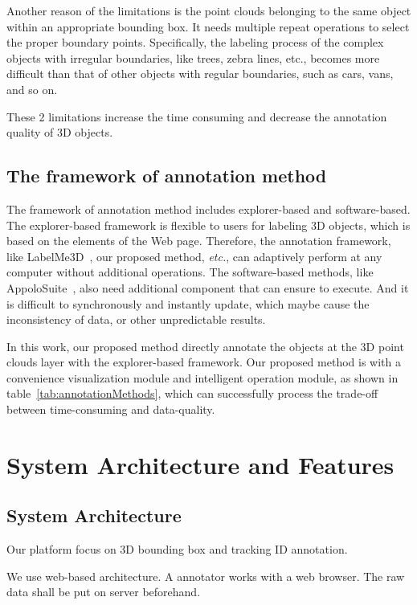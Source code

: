 \documentclass[letterpaper, 10 pt, conference]{ieeeconf}  %
\begin{document}
Another reason of the limitations is the point clouds belonging to the same object within an appropriate bounding box.
It needs multiple repeat operations to select the proper boundary points.
Specifically, the labeling process of the complex objects with irregular boundaries, like trees, zebra lines, etc., becomes more difficult than that of other objects with regular boundaries, such as cars, vans, and so on.

These 2 limitations increase the time consuming and decrease the annotation quality of 3D objects.
\subsection{The framework of annotation method}
The framework of annotation method includes explorer-based and software-based. The explorer-based framework is flexible to users for labeling 3D objects, which is based on the elements of the Web page. Therefore, the annotation framework, like LabelMe3D~\cite{LabelMe3D}, our proposed method, \emph{etc.}, can adaptively perform at any computer without additional operations. The software-based methods, like AppoloSuite~\cite{SUPERVISELY,wang2019apolloscape}, also need additional component that can ensure to execute. And it is difficult to synchronously and instantly update, which maybe cause the inconsistency of data, or other unpredictable results.

In this work, our proposed method directly annotate the objects at the 3D point clouds layer with the explorer-based framework. Our proposed method is with a convenience visualization module and intelligent operation module, as shown in table~\ref{tab:annotationMethods}, which can successfully process the trade-off between time-consuming and data-quality.

\section{System Architecture and Features}

\subsection{System Architecture}
Our platform focus on 3D bounding box and tracking ID annotation. 

We use web-based architecture. A annotator works with a web browser. The raw data shall be put on server beforehand. 
\end{document}
